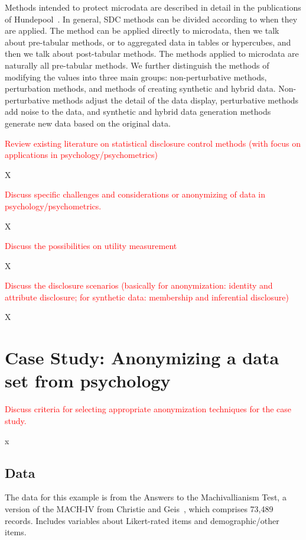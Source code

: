 \documentclass{article}
\begin{document}
Methods intended to protect microdata are described in detail in the publications of Hundepool~\cite{2012_Hundepool}. In general, SDC methods can be divided according to when they are applied. The method can be applied directly to microdata, then we talk about pre-tabular methods, or to aggregated data in tables or hypercubes, and then we talk about post-tabular methods. The methods applied to microdata are naturally all pre-tabular methods.
We further distinguish the methods of modifying the values into three main groups: non-perturbative methods, perturbation methods, and methods of creating synthetic and hybrid data. Non-perturbative methods adjust the detail of the data display, perturbative methods add noise to the data, and synthetic and hybrid data generation methods generate new data based on the original data. 
\newline

\textcolor{red}{Review existing literature on statistical disclosure control methods (with focus on applications in psychology/psychometrics)}

X

\textcolor{red}{Discuss specific challenges and considerations or anonymizing of data in psychology/psychometrics.}

X

\textcolor{red}{Discuss the possibilities on utility measurement}

X

\textcolor{red}{Discuss the disclosure scenarios (basically for anonymization: identity and attribute disclosure; for synthetic data: membership and inferential disclosure)}

X

\section{Case Study: Anonymizing a data set from psychology}

\textcolor{red}{Discuss criteria for selecting appropriate anonymization techniques for the case study.}

x

\subsection{Data}

The data for this example is from the Answers to the Machivallianism Test, a version of the MACH-IV from Christie and Geis~\cite{Data}, which comprises 73,489 records.
Includes variables about Likert-rated items and demographic/other items.
\end{document}
